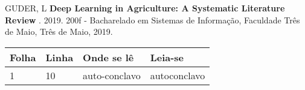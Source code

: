 \begin{errata}
GUDER, L \textbf{Deep Learning in Agriculture: A Systematic Literature Review} . 2019. 200f - Bacharelado em Sistemas de Informação, Faculdade Três de Maio, Três de Maio, 2019.
\begin{table}[htb]
\center
\footnotesize
\begin{tabular}{|p{1.4cm}|p{1cm}|p{3cm}|p{3cm}|}
\hline
\textbf{Folha} & \textbf{Linha} & \textbf{Onde se lê} &
\textbf{Leia-se}\\
\hline
1 & 10 & auto-conclavo & autoconclavo\\
\hline
\end{tabular}
\end{table}
\end{errata}